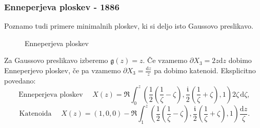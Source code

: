 \documentclass[8pt]{beamer}
\newcommand{\samplescalar}{50} %
\theoremstyle{definition}
\theoremstyle{remark}
\theoremstyle{plain}
\numberwithin{equation}{section}  %
\begin{document}
\begin{frame}
    \frametitle{Enneperjeva ploskev - 1886}
    
    Poznamo tudi primere minimalnih ploskev, ki si deljo isto Gaussovo preslikavo. 

    \begin{figure}[H]
        \centering

        \caption{Enneperjeva ploskev}
    \end{figure}

    Za Gaussovo preslikavo izberemo $\mathfrak{g}(z)=z$. Če vzamemo $\partial X_3=2 z \mathrm{d} z$ dobimo Enneperjevo ploskev, če pa vzamemo $\partial X_3=\frac{\mathrm{d} z}{z}$ pa dobimo katenoid. Eksplicitno povedano: 
    \begin{equation*}
        \text { Enneperjeva ploskev } \quad X(z)=\Re \int_0^z\left(\frac{1}{2}\left(\frac{1}{\zeta}-\zeta\right), \frac{\mathfrak{i}}{2}\left(\frac{1}{\zeta}+\zeta\right), 1\right) 2 \zeta \, \mathrm{d} \zeta,
    \end{equation*}  
    \begin{equation*}
        \text { Katenoida } \quad X(z)=(1,0,0)-\Re \int_1^z\left(\frac{1}{2}\left(\frac{1}{\zeta} - \zeta\right), \frac{\mathfrak{i}}{2}\left(\frac{1}{\zeta}+\zeta\right), 1\right) \frac{\mathrm{d} z}{\zeta} .
    \end{equation*}
\end{frame}
\end{document}
